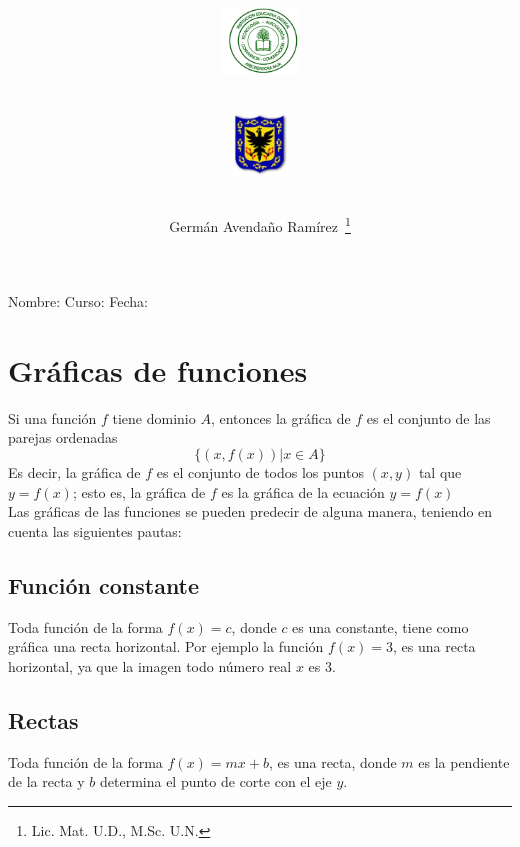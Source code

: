 \documentclass[10pt,twoside]{article}
\author{Germ\'an Avenda\~no Ram\'irez~\thanks{Lic. Mat. U.D., M.Sc. U.N.}}
\title{\begin{minipage}{.2\textwidth}
\includegraphics[height=1.75cm]{Images/logo-colegio.png}\end{minipage}
\begin{minipage}{.55\textwidth}
\begin{center}
\end{center}
\end{minipage}\hfill
\begin{minipage}{.2\textwidth}
\includegraphics[height=1.75cm]{Images/logo-sed.png} 
\end{minipage}}
\date{}
\begin{document}
\maketitle
Nombre: \hrulefill Curso: \underline{\hspace*{44pt}} Fecha: \underline{\hspace*{2.5cm}}
\section{Gráficas de funciones}
Si una función $ f $ tiene dominio $ A $, entonces la gráfica de $ f $ es el conjunto de las parejas ordenadas
\[ \{(x,f(x)) | x \in A\} \]
Es decir, la gráfica de $ f $ es el conjunto de todos los puntos $ (x,y) $ tal que $ y=f(x) $; esto es, la gráfica de $ f $ es la gráfica de la ecuación $ y=f(x) $\\

Las gráficas de las funciones se pueden predecir de alguna manera, teniendo en cuenta las siguientes pautas:
\subsection{Función constante}
Toda función de la forma $ f(x)=c $, donde $ c $ es una constante, tiene como gráfica una recta horizontal. Por ejemplo la función $ f(x)=3 $, es una recta horizontal, ya que la imagen todo número real $ x $ es 3.
\subsection{Rectas}
Toda función de la forma $ f(x)=mx+b $, es una recta, donde $ m $ es la pendiente de la recta y $ b $ determina el punto de corte con el eje $ y $.
\end{document}
